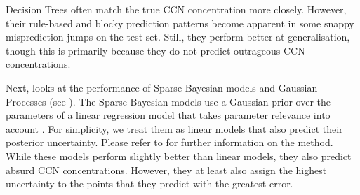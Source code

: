Decision Trees often match the true CCN concentration more closely. However, their rule-based and blocky prediction patterns become apparent in some snappy misprediction jumps on the test set. Still, they perform better at generalisation, though this is primarily because they do not predict outrageous CCN concentrations.

\newpar Next,  looks at the performance of Sparse Bayesian models and Gaussian Processes (see ). The Sparse Bayesian models use a Gaussian prior over the parameters of a linear regression model that takes parameter relevance into account \cite{sparse-bayesian-1996}. For simplicity, we treat them as linear models that also predict their posterior uncertainty. Please refer to \textcite{sparse-bayesian-1996} for further information on the method. While these models perform slightly better than linear models, they also predict absurd CCN concentrations. However, they at least also assign the highest uncertainty to the points that they predict with the greatest error.

